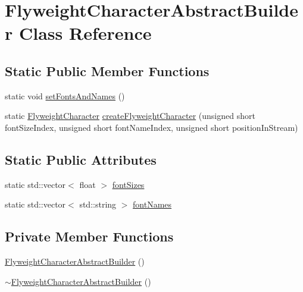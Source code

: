 \hypertarget{classFlyweightCharacterAbstractBuilder}{}\section{Flyweight\+Character\+Abstract\+Builder Class Reference}
\label{classFlyweightCharacterAbstractBuilder}
\subsection*{Static Public Member Functions}
\begin{DoxyCompactItemize}
\item 
static void \hyperlink{classFlyweightCharacterAbstractBuilder_ac5913cdc99a7af95a502d2665106a21f}{set\+Fonts\+And\+Names} ()
\item 
static \hyperlink{classFlyweightCharacter}{Flyweight\+Character} \hyperlink{classFlyweightCharacterAbstractBuilder_a06267194fa4fda26efc159c0e3b69762}{create\+Flyweight\+Character} (unsigned short font\+Size\+Index, unsigned short font\+Name\+Index, unsigned short position\+In\+Stream)
\end{DoxyCompactItemize}
\subsection*{Static Public Attributes}
\begin{DoxyCompactItemize}
\item 
static std\+::vector$<$ float $>$ \hyperlink{classFlyweightCharacterAbstractBuilder_ad218358c55dae716e3ac08f453e5ab0a}{font\+Sizes}
\item 
static std\+::vector$<$ std\+::string $>$ \hyperlink{classFlyweightCharacterAbstractBuilder_a9b25dfdcb7fb87b00acb05616ba50dc2}{font\+Names}
\end{DoxyCompactItemize}
\subsection*{Private Member Functions}
\begin{DoxyCompactItemize}
\item 
\hyperlink{classFlyweightCharacterAbstractBuilder_a32d31a8c1a4d7987fef5273d86ec3f7c}{Flyweight\+Character\+Abstract\+Builder} ()
\item 
\hyperlink{classFlyweightCharacterAbstractBuilder_a0553f2afdf91ca5e4b7821c1e3895595}{$\sim$\+Flyweight\+Character\+Abstract\+Builder} ()
\end{DoxyCompactItemize}


